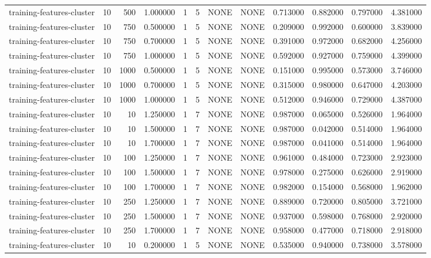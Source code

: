 \begin{tabular}{lrrrllllrrrr}
training-features-cluster & 10 & 500 & 1.000000 & 1 & 5 & NONE & NONE & 0.713000 & 0.882000 & 0.797000 & 4.381000 \\
training-features-cluster & 10 & 750 & 0.500000 & 1 & 5 & NONE & NONE & 0.209000 & 0.992000 & 0.600000 & 3.839000 \\
training-features-cluster & 10 & 750 & 0.700000 & 1 & 5 & NONE & NONE & 0.391000 & 0.972000 & 0.682000 & 4.256000 \\
training-features-cluster & 10 & 750 & 1.000000 & 1 & 5 & NONE & NONE & 0.592000 & 0.927000 & 0.759000 & 4.399000 \\
training-features-cluster & 10 & 1000 & 0.500000 & 1 & 5 & NONE & NONE & 0.151000 & 0.995000 & 0.573000 & 3.746000 \\
training-features-cluster & 10 & 1000 & 0.700000 & 1 & 5 & NONE & NONE & 0.315000 & 0.980000 & 0.647000 & 4.203000 \\
training-features-cluster & 10 & 1000 & 1.000000 & 1 & 5 & NONE & NONE & 0.512000 & 0.946000 & 0.729000 & 4.387000 \\
training-features-cluster & 10 & 10 & 1.250000 & 1 & 7 & NONE & NONE & 0.987000 & 0.065000 & 0.526000 & 1.964000 \\
training-features-cluster & 10 & 10 & 1.500000 & 1 & 7 & NONE & NONE & 0.987000 & 0.042000 & 0.514000 & 1.964000 \\
training-features-cluster & 10 & 10 & 1.700000 & 1 & 7 & NONE & NONE & 0.987000 & 0.041000 & 0.514000 & 1.964000 \\
training-features-cluster & 10 & 100 & 1.250000 & 1 & 7 & NONE & NONE & 0.961000 & 0.484000 & 0.723000 & 2.923000 \\
training-features-cluster & 10 & 100 & 1.500000 & 1 & 7 & NONE & NONE & 0.978000 & 0.275000 & 0.626000 & 2.919000 \\
training-features-cluster & 10 & 100 & 1.700000 & 1 & 7 & NONE & NONE & 0.982000 & 0.154000 & 0.568000 & 1.962000 \\
training-features-cluster & 10 & 250 & 1.250000 & 1 & 7 & NONE & NONE & 0.889000 & 0.720000 & 0.805000 & 3.721000 \\
training-features-cluster & 10 & 250 & 1.500000 & 1 & 7 & NONE & NONE & 0.937000 & 0.598000 & 0.768000 & 2.920000 \\
training-features-cluster & 10 & 250 & 1.700000 & 1 & 7 & NONE & NONE & 0.958000 & 0.477000 & 0.718000 & 2.918000 \\
training-features-cluster & 10 & 10 & 0.200000 & 1 & 5 & NONE & NONE & 0.535000 & 0.940000 & 0.738000 & 3.578000 \\

\end{tabular}
